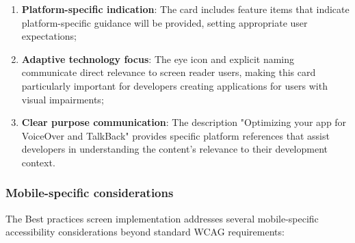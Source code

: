 \begin{enumerate}
    \item \textbf{Platform-specific indication}: The card includes feature items that indicate platform-specific guidance will be provided, setting appropriate user expectations;
    
    \item \textbf{Adaptive technology focus}: The eye icon and explicit naming communicate direct relevance to screen reader users, making this card particularly important for developers creating applications for users with visual impairments;
    
    \item \textbf{Clear purpose communication}: The description "Optimizing your app for VoiceOver and TalkBack" provides specific platform references that assist developers in understanding the content's relevance to their development context.
\end{enumerate}

\subsubsection{Mobile-specific considerations}

The Best practices screen implementation addresses several mobile-specific accessibility considerations beyond standard WCAG requirements:

